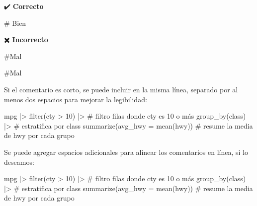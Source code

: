\documentclass[
  spanish,
  a4paper,
]{scrbook}
\newenvironment{Shaded}{\begin{snugshade}}{\end{snugshade}}
\newcommand{\AttributeTok}[1]{\textcolor[rgb]{0.40,0.45,0.13}{#1}}
\newcommand{\CommentTok}[1]{\textcolor[rgb]{0.37,0.37,0.37}{#1}}
\newcommand{\DecValTok}[1]{\textcolor[rgb]{0.68,0.00,0.00}{#1}}
\newcommand{\FunctionTok}[1]{\textcolor[rgb]{0.28,0.35,0.67}{#1}}
\newcommand{\NormalTok}[1]{\textcolor[rgb]{0.00,0.23,0.31}{#1}}
\newcommand{\SpecialCharTok}[1]{\textcolor[rgb]{0.37,0.37,0.37}{#1}}
\begin{document}
✔️ \textbf{Correcto}

\begin{Shaded}
\begin{Highlighting}[]
\CommentTok{\# Bien}
\end{Highlighting}
\end{Shaded}

✖️ \textbf{Incorrecto}

\begin{Shaded}
\begin{Highlighting}[]
\CommentTok{\#Mal}

      \CommentTok{\#Mal}
\end{Highlighting}
\end{Shaded}

Si el comentario es corto, se puede incluir en la misma línea, separado
por al menos dos espacios para mejorar la legibilidad:

\begin{Shaded}
\begin{Highlighting}[]
\NormalTok{mpg }\SpecialCharTok{|\textgreater{}} 
  \FunctionTok{filter}\NormalTok{(cty }\SpecialCharTok{\textgreater{}} \DecValTok{10}\NormalTok{) }\SpecialCharTok{|\textgreater{}}  \CommentTok{\# filtro filas donde cty es 10 o más}
  \FunctionTok{group\_by}\NormalTok{(class) }\SpecialCharTok{|\textgreater{}}  \CommentTok{\# estratifica por class}
  \FunctionTok{summarize}\NormalTok{(}\AttributeTok{avg\_hwy =} \FunctionTok{mean}\NormalTok{(hwy))  }\CommentTok{\# resume la media de hwy por cada grupo}
\end{Highlighting}
\end{Shaded}

Se puede agregar espacios adicionales para alinear los comentarios en
línea, si lo deseamos:

\begin{Shaded}
\begin{Highlighting}[]
\NormalTok{mpg }\SpecialCharTok{|\textgreater{}} 
  \FunctionTok{filter}\NormalTok{(cty }\SpecialCharTok{\textgreater{}} \DecValTok{10}\NormalTok{) }\SpecialCharTok{|\textgreater{}}             \CommentTok{\# filtro filas donde cty es 10 o más}
  \FunctionTok{group\_by}\NormalTok{(class) }\SpecialCharTok{|\textgreater{}}              \CommentTok{\# estratifica por class}
  \FunctionTok{summarize}\NormalTok{(}\AttributeTok{avg\_hwy =} \FunctionTok{mean}\NormalTok{(hwy))  }\CommentTok{\# resume la media de hwy por cada grupo}
\end{Highlighting}
\end{Shaded}
\end{document}
